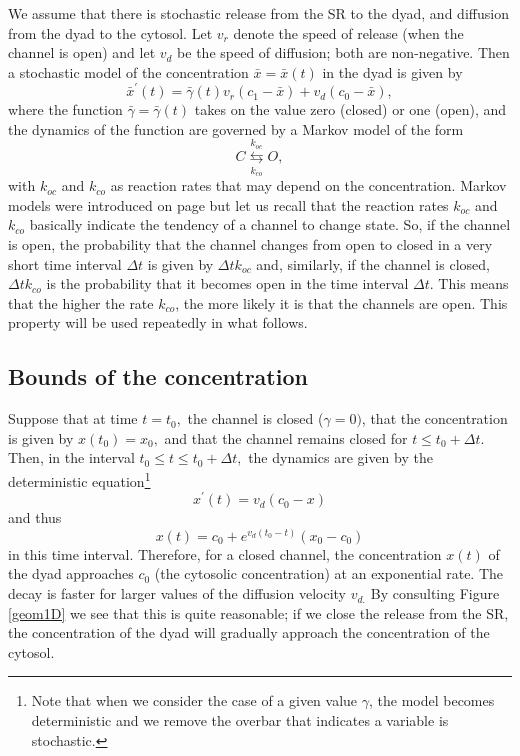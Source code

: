 We assume that there is stochastic release from the SR to the dyad, and diffusion from the dyad to the cytosol. Let $v_{r}$ denote the
speed of release (when the channel is open) and let $v_{d}$ be the speed of diffusion; both are non-negative. Then a stochastic
model of the concentration $\bar{x}=\bar{x}(t)$ in the dyad is given by%
\begin{equation}
\bar{x}^{\prime}(t)=\bar{\gamma}(t)v_{r}(c_{1}-\bar{x})+v_{d}(c_{0}-\bar{x}), \label{ode1}%
\end{equation}
where the function $\bar{\gamma}=\bar{\gamma}(t)$ takes on the value zero (closed) or one
(open), and the dynamics of the function are governed by a Markov model of the
form
\begin{equation}
C\underset{k_{co}}{\overset{k_{oc}}{\leftrightarrows}}O, \label{Markov}%
\end{equation}
with $k_{oc}$ and $k_{co}$ as reaction rates that may depend on the concentration.
Markov models were introduced on page \pageref{markovintro} but let us recall that the 
reaction rates $k_{oc}$ and $k_{co}$ basically indicate the tendency of a channel to change state. So, if 
the channel is open, the probability that the channel changes from open to closed in a very short time interval
$\Delta t$ is given by $\Delta t k_{oc}$ and, similarly, if the channel is closed,
 $\Delta t k_{co}$ is the probability that it becomes open in the time interval $\Delta t$. 
 This means that the higher the rate $k_{co}$,  the more likely it is that the channels are open. This property will be used repeatedly in what follows. 

\subsection{Bounds of the concentration}

Suppose that at time $t=t_{0},$ the channel is closed ($\gamma=0)$, that the
concentration is given by $x(t_0)=x_{0},$ and that the channel remains closed for
$t\leqslant t_{0}+\Delta t.$ Then, in the interval $t_{0}\leqslant t\leqslant
t_{0}+\Delta t,$ the dynamics are given by the deterministic equation\footnote{Note that when we consider the case of a given value
$\gamma$, the model becomes deterministic and we remove the overbar that
indicates a variable is stochastic.}%
\[
x^{\prime}(t)=v_{d}(c_{0}-x)
\]
and thus%
\[
x(t)=c_{0}+e^{v_{d}(t_{0}-t)}\left(  x_{0}-c_{0}\right)
\]
in this time interval.  Therefore, for a closed channel, the concentration $x(t)$ of the
dyad approaches $c_{0}$ (the cytosolic concentration) at an exponential
rate. The decay is faster for larger values of the diffusion
velocity $v_{d.}$ By consulting Figure \ref{geom1D} we see that this is quite
reasonable; if we close the release from the SR, the concentration of the dyad will gradually approach
the concentration of the cytosol.

